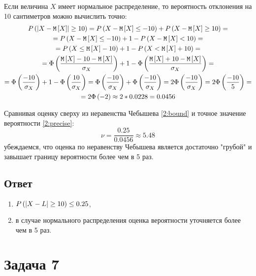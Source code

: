 Если величина $X$ имеет нормальное распределение, то вероятность отклонения на 10 сантиметров можно вычислить точно:
\begin{multline}
    \label{2:precise}
    P \left ( \left | X - \mathtt{M} \left [ X \right ] \right | \ge 10 \right )
    = P \left ( X - \mathtt{M} \left [ X \right ] \le - 10 \right ) + P \left (  X - \mathtt{M} \left [ X \right ] \ge 10 \right ) = \\
    = P \left ( X - \mathtt{M} \left [ X \right ] \le - 10 \right ) + 1 - P \left (  X - \mathtt{M} \left [ X \right ] < 10 \right ) = \\
    = P \left ( X \le \mathtt{M} \left [ X \right ] - 10 \right ) + 1 - P \left (  X < \mathtt{M} \left [ X \right ] + 10 \right ) = \\
    = \Phi \left ( \frac{\mathtt{M} \left [ X \right ] - 10 - \mathtt{M} \left [ X \right ]}{\sigma_X} \right ) + 1 - \Phi \left ( \frac{\mathtt{M} \left [ X \right ] + 10 - \mathtt{M} \left [ X \right ]}{\sigma_X} \right ) = \\
    = \Phi \left ( \frac{- 10}{\sigma_X} \right ) + 1 - \Phi \left ( \frac{10}{\sigma_X} \right )
    = \Phi \left ( \frac{- 10}{\sigma_X} \right ) + \Phi \left ( \frac{- 10}{\sigma_X} \right )
    = 2 \Phi \left ( \frac{- 10}{\sigma_X} \right )
    = 2 \Phi \left ( \frac{- 10}{5} \right ) = \\
    = 2 \Phi \left ( - 2 \right )
    \approx 2 * 0.0228
    = 0.0456
\end{multline}

Сравнивая оценку сверху из неравенства Чебышева \eqref{2:bound} и точное значение вероятности \eqref{2:precise}:
\begin{equation}
    \nu = \frac{0.25}{0.0456} \approx 5.48
\end{equation}
убеждаемся, что оценка по неравенству Чебышева является достаточно "грубой"{} и завышает границу вероятности более чем в 5 раз.
\subsection*{Ответ}
\begin{enumerate}
    \item $ P \left (  \left | X - L \right | \ge 10  \right ) \le 0.25 $,
    \item в случае нормального распределения оценка вероятности уточняется более чем в 5 раз.
\end{enumerate}

\section*{Задача 7}

